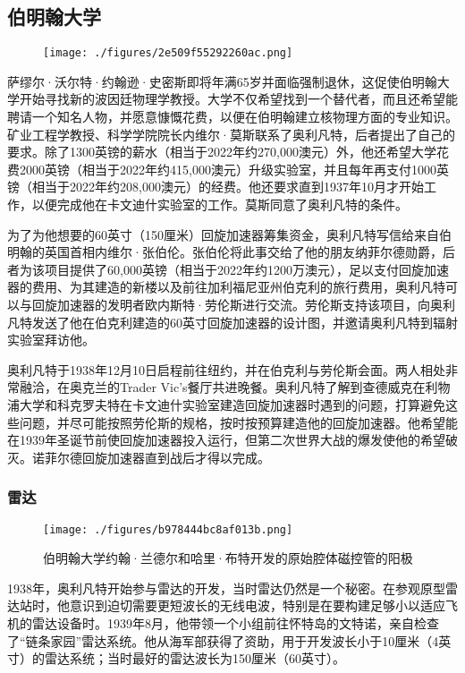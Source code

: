 \subsection{伯明翰大学}
\begin{figure}[ht]
\centering
\texttt{[image: ./figures/2e509f55292260ac.png]}
\caption{} \label{fig_MKalft_4}
\end{figure}
萨缪尔·沃尔特·约翰逊·史密斯即将年满65岁并面临强制退休，这促使伯明翰大学开始寻找新的波因廷物理学教授。大学不仅希望找到一个替代者，而且还希望能聘请一个知名人物，并愿意慷慨花费，以便在伯明翰建立核物理方面的专业知识。矿业工程学教授、科学学院院长内维尔·莫斯联系了奥利凡特，后者提出了自己的要求。除了1300英镑的薪水（相当于2022年约270,000澳元）外，他还希望大学花费2000英镑（相当于2022年约415,000澳元）升级实验室，并且每年再支付1000英镑（相当于2022年约208,000澳元）的经费。他还要求直到1937年10月才开始工作，以便完成他在卡文迪什实验室的工作。莫斯同意了奥利凡特的条件。

为了为他想要的60英寸（150厘米）回旋加速器筹集资金，奥利凡特写信给来自伯明翰的英国首相内维尔·张伯伦。张伯伦将此事交给了他的朋友纳菲尔德勋爵，后者为该项目提供了60,000英镑（相当于2022年约1200万澳元），足以支付回旋加速器的费用、为其建造的新楼以及前往加利福尼亚州伯克利的旅行费用，奥利凡特可以与回旋加速器的发明者欧内斯特·劳伦斯进行交流。劳伦斯支持该项目，向奥利凡特发送了他在伯克利建造的60英寸回旋加速器的设计图，并邀请奥利凡特到辐射实验室拜访他。

奥利凡特于1938年12月10日启程前往纽约，并在伯克利与劳伦斯会面。两人相处非常融洽，在奥克兰的Trader Vic's餐厅共进晚餐。奥利凡特了解到查德威克在利物浦大学和科克罗夫特在卡文迪什实验室建造回旋加速器时遇到的问题，打算避免这些问题，并尽可能按照劳伦斯的规格，按时按预算建造他的回旋加速器。他希望能在1939年圣诞节前使回旋加速器投入运行，但第二次世界大战的爆发使他的希望破灭。诺菲尔德回旋加速器直到战后才得以完成。
\subsubsection{雷达}
\begin{figure}[ht]
\centering
\texttt{[image: ./figures/b978444bc8af013b.png]}
\caption{伯明翰大学约翰·兰德尔和哈里·布特开发的原始腔体磁控管的阳极} \label{fig_MKalft_5}
\end{figure}
1938年，奥利凡特开始参与雷达的开发，当时雷达仍然是一个秘密。在参观原型雷达站时，他意识到迫切需要更短波长的无线电波，特别是在要构建足够小以适应飞机的雷达设备时。1939年8月，他带领一个小组前往怀特岛的文特诺，亲自检查了“链条家园”雷达系统。他从海军部获得了资助，用于开发波长小于10厘米（4英寸）的雷达系统；当时最好的雷达波长为150厘米（60英寸）。

